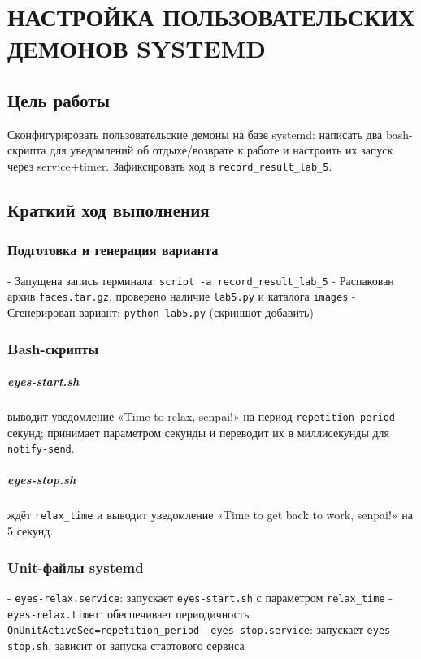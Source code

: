 \chapter{НАСТРОЙКА ПОЛЬЗОВАТЕЛЬСКИХ ДЕМОНОВ SYSTEMD}

\section{Цель работы}
Сконфигурировать пользовательские демоны на базе systemd: написать два bash-скрипта для уведомлений об отдыхе/возврате к работе и настроить их запуск через service+timer. Зафиксировать ход в \texttt{record\_result\_lab\_5}.

\section{Краткий ход выполнения}
\subsection{Подготовка и генерация варианта}
- Запущена запись терминала: \texttt{script -a record\_result\_lab\_5}
- Распакован архив \texttt{faces.tar.gz}, проверено наличие \texttt{lab5.py} и каталога \texttt{images}
- Сгенерирован вариант: \texttt{python lab5.py} (скриншот добавить)

\subsection{Bash-скрипты}
\paragraph{eyes-start.sh} выводит уведомление «Time to relax, senpai!» на период \texttt{repetition\_period} секунд; принимает параметром секунды и переводит их в миллисекунды для \texttt{notify-send}.
\paragraph{eyes-stop.sh} ждёт \texttt{relax\_time} и выводит уведомление «Time to get back to work, senpai!» на 5 секунд.

\subsection{Unit-файлы systemd}
- \texttt{eyes-relax.service}: запускает \texttt{eyes-start.sh} с параметром \texttt{relax\_time}
- \texttt{eyes-relax.timer}: обеспечивает периодичность \texttt{OnUnitActiveSec=repetition\_period}
- \texttt{eyes-stop.service}: запускает \texttt{eyes-stop.sh}, зависит от запуска стартового сервиса

